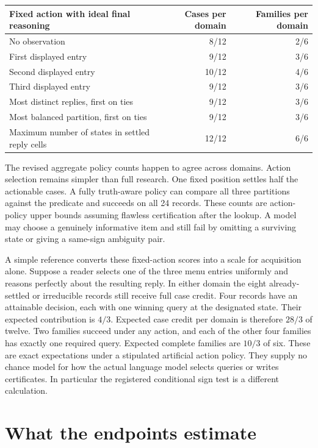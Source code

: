 \documentclass[12pt,letterpaper]{article}
\begin{document}
\begin{center}\small\begin{tabularx}{\linewidth}{Yrr}\toprule
Fixed action with ideal final reasoning & Cases per domain & Families per domain\\\midrule
No observation & 8/12 & 2/6\\
First displayed entry & 9/12 & 3/6\\
Second displayed entry & 10/12 & 4/6\\
Third displayed entry & 9/12 & 3/6\\
Most distinct replies, first on ties & 9/12 & 3/6\\
Most balanced partition, first on ties & 9/12 & 3/6\\
Maximum number of states in settled reply cells & 12/12 & 6/6\\\bottomrule
\end{tabularx}\end{center}
The revised aggregate policy counts happen to agree across domains. Action selection remains simpler than full research. One fixed position settles half the actionable cases. A fully truth-aware policy can compare all three partitions against the predicate and succeeds on all 24 records. These counts are action-policy upper bounds assuming flawless certification after the lookup. A model may choose a genuinely informative item and still fail by omitting a surviving state or giving a same-sign ambiguity pair.

A simple reference converts these fixed-action scores into a scale for acquisition alone. Suppose a reader selects one of the three menu entries uniformly and reasons perfectly about the resulting reply. In either domain the eight already-settled or irreducible records still receive full case credit. Four records have an attainable decision, each with one winning query at the designated state. Their expected contribution is $4/3$. Expected case credit per domain is therefore $28/3$ of twelve. Two families succeed under any action, and each of the other four families has exactly one required query. Expected complete families are $10/3$ of six. These are exact expectations under a stipulated artificial action policy. They supply no chance model for how the actual language model selects queries or writes certificates. In particular the registered conditional sign test is a different calculation.

\section{What the endpoints estimate}
\end{document}
